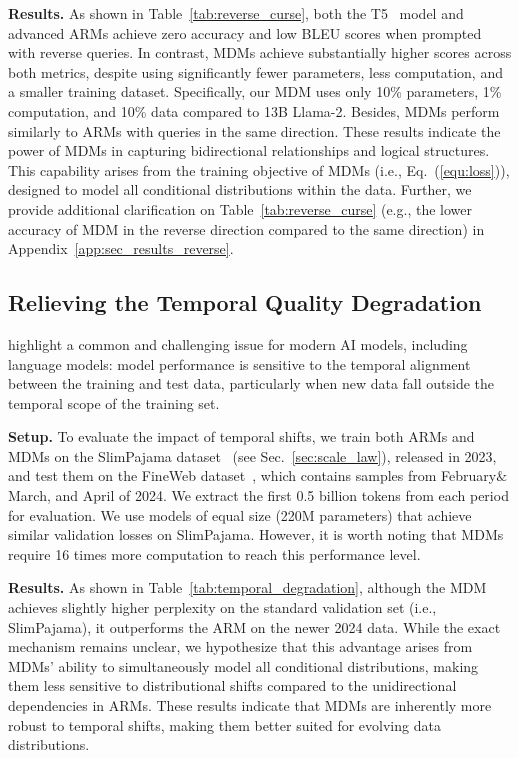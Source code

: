 \documentclass{article} %
\begin{document}
\textbf{Results.} As shown in Table~\ref{tab:reverse_curse}, both the T5~\citep{raffel2020exploring} model and advanced ARMs achieve zero accuracy and low BLEU scores when prompted with reverse queries. 
In contrast, MDMs achieve substantially higher scores across both metrics, despite using significantly fewer parameters, less computation, and a smaller training dataset. Specifically, our MDM uses only 10\% parameters, 1\% computation, and 10\% data compared to 13B Llama-2. 
Besides, MDMs perform similarly to ARMs with queries in the same direction.
These results indicate the power of MDMs in capturing bidirectional relationships and logical structures. This capability arises from the training objective of MDMs (i.e., Eq.~(\ref{equ:loss})), designed to model all conditional distributions within the data. Further, we provide additional clarification on Table~\ref{tab:reverse_curse} (e.g., the lower accuracy of MDM in the reverse direction compared to the same direction) in Appendix~\ref{app:sec_results_reverse}.

\subsection{Relieving the Temporal Quality Degradation}

\citet{vela2022temporal} highlight a common and challenging issue for modern AI models, including language models: model performance is sensitive to the temporal alignment between the training and test data, particularly when new data fall outside the temporal scope of the training set.

\textbf{Setup.} To evaluate the impact of temporal shifts, we train both ARMs and MDMs on the SlimPajama dataset~\citep{cerebras2023slimpajama} (see Sec.~\ref{sec:scale_law}), released in 2023, and test them on the FineWeb dataset~\citep{penedo2024finewebdatasetsdecantingweb}, which contains samples from February$\&$March, and April of 2024. We extract the first 0.5 billion tokens from each period for evaluation. We use models of equal size (220M parameters) that achieve similar validation losses on SlimPajama. However, it is worth noting that MDMs require 16 times more computation to reach this performance level.


\textbf{Results.} As shown in Table~\ref{tab:temporal_degradation}, although the MDM achieves slightly higher perplexity on the standard validation set (i.e., SlimPajama), it outperforms the ARM on the newer 2024 data. While the exact mechanism remains unclear, we hypothesize that this advantage arises from MDMs’ ability to simultaneously model all conditional distributions, making them less sensitive to distributional shifts compared to the unidirectional dependencies in ARMs. These results indicate that MDMs are inherently more robust to temporal shifts, making them better suited for evolving data distributions.
\end{document}
